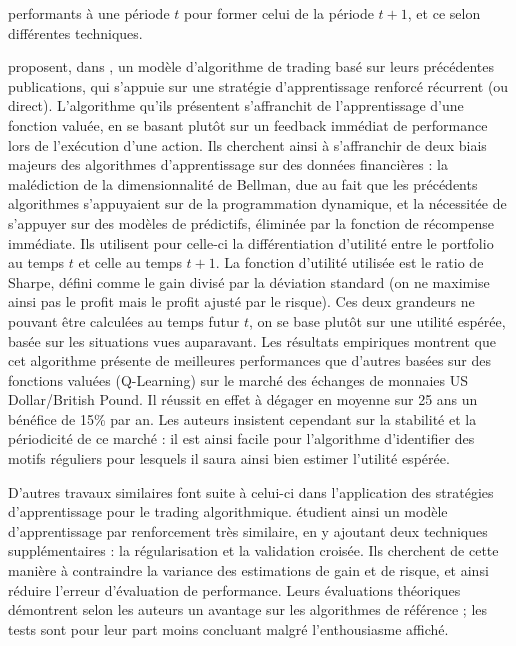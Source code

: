 \documentclass[a4paper, 10pt]{article}
\begin{document}
performants à une période $t$ pour former celui de la période $t+1$, et ce selon différentes techniques.

\textbf{\citet{Moody2001}} proposent, dans \textbf{}, un modèle d'algorithme de trading basé sur leurs précédentes publications, qui s'appuie sur une stratégie d'apprentissage renforcé récurrent (ou direct). L'algorithme qu'ils présentent s'affranchit de l'apprentissage d'une fonction valuée, en se basant plutôt sur un feedback immédiat de performance lors de l'exécution d'une action. Ils cherchent ainsi à s'affranchir de deux biais majeurs des algorithmes d'apprentissage sur des données financières : la malédiction de la dimensionnalité de Bellman, due au fait que les précédents algorithmes s'appuyaient sur de la programmation dynamique, et la nécessitée de s'appuyer sur des modèles de prédictifs, éliminée par la fonction de récompense immédiate. Ils utilisent pour celle-ci la différentiation d'utilité entre le portfolio au temps $t$ et celle au temps $t+1$. La fonction d'utilité utilisée est le ratio de Sharpe, défini comme le gain divisé par la déviation standard (on ne maximise ainsi pas le profit mais le profit ajusté par le risque). Ces deux grandeurs ne pouvant être calculées au temps futur $t$, on se base plutôt sur une utilité espérée, basée sur les situations vues auparavant. Les résultats empiriques montrent que cet algorithme présente de meilleures performances que d'autres basées sur des fonctions valuées (Q-Learning) sur le marché des échanges de monnaies US Dollar/British Pound. Il réussit en effet à dégager en moyenne sur 25 ans un bénéfice de 15\% par an. Les auteurs insistent cependant sur la stabilité et la périodicité de ce marché : il est ainsi facile pour l'algorithme d'identifier des motifs réguliers pour lesquels il saura ainsi bien estimer l'utilité espérée.

D'autres travaux similaires font suite à celui-ci dans l'application des stratégies d'apprentissage pour le trading algorithmique. \textbf{\citet{Ban2016}} étudient ainsi un modèle d'apprentissage par renforcement très similaire, en y ajoutant deux techniques supplémentaires : la régularisation et la validation croisée. Ils cherchent de cette manière à contraindre la variance des estimations de gain et de risque, et ainsi réduire l'erreur d'évaluation de performance. Leurs évaluations théoriques démontrent selon les auteurs un avantage sur les algorithmes de référence ; les tests sont pour leur part moins concluant malgré l'enthousiasme affiché.
\end{document}
